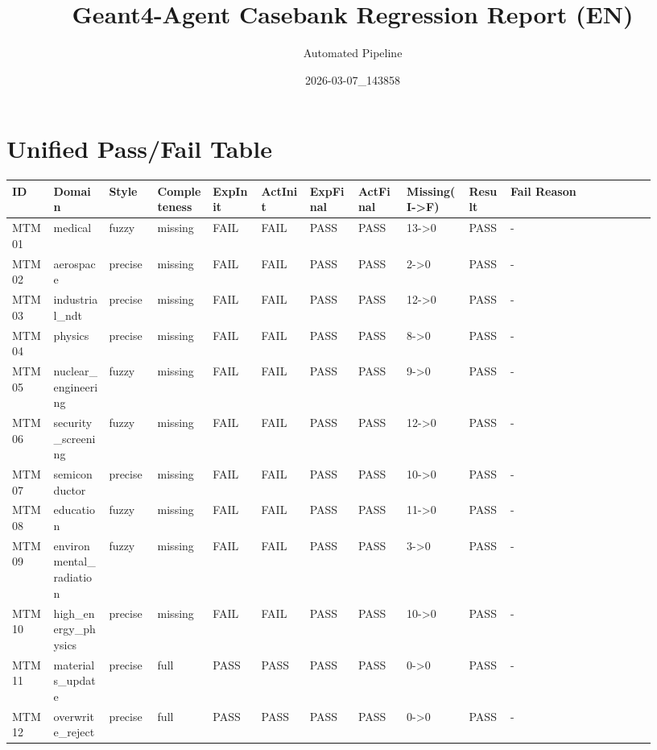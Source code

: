 \documentclass[11pt]{ctexart}
\title{Geant4-Agent Casebank Regression Report (EN)}
\author{Automated Pipeline}
\date{2026-03-07\_143858}
\begin{document}
\maketitle
\section{Unified Pass/Fail Table}
\begin{longtable}{p{0.06\linewidth}p{0.08\linewidth}p{0.07\linewidth}p{0.08\linewidth}p{0.07\linewidth}p{0.07\linewidth}p{0.07\linewidth}p{0.07\linewidth}p{0.09\linewidth}p{0.06\linewidth}p{0.21\linewidth}}
\toprule
ID & Domain & Style & Completeness & ExpInit & ActInit & ExpFinal & ActFinal & Missing(I->F) & Result & Fail Reason \\
\midrule
MTM01 & medical & fuzzy & missing & FAIL & FAIL & PASS & PASS & 13->0 & PASS & - \\
MTM02 & aerospace & precise & missing & FAIL & FAIL & PASS & PASS & 2->0 & PASS & - \\
MTM03 & industrial\_ndt & precise & missing & FAIL & FAIL & PASS & PASS & 12->0 & PASS & - \\
MTM04 & physics & precise & missing & FAIL & FAIL & PASS & PASS & 8->0 & PASS & - \\
MTM05 & nuclear\_engineering & fuzzy & missing & FAIL & FAIL & PASS & PASS & 9->0 & PASS & - \\
MTM06 & security\_screening & fuzzy & missing & FAIL & FAIL & PASS & PASS & 12->0 & PASS & - \\
MTM07 & semiconductor & precise & missing & FAIL & FAIL & PASS & PASS & 10->0 & PASS & - \\
MTM08 & education & fuzzy & missing & FAIL & FAIL & PASS & PASS & 11->0 & PASS & - \\
MTM09 & environmental\_radiation & fuzzy & missing & FAIL & FAIL & PASS & PASS & 3->0 & PASS & - \\
MTM10 & high\_energy\_physics & precise & missing & FAIL & FAIL & PASS & PASS & 10->0 & PASS & - \\
MTM11 & materials\_update & precise & full & PASS & PASS & PASS & PASS & 0->0 & PASS & - \\
MTM12 & overwrite\_reject & precise & full & PASS & PASS & PASS & PASS & 0->0 & PASS & - \\
\bottomrule
\end{longtable}
\end{document}
